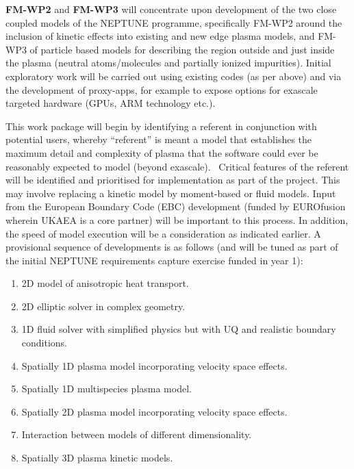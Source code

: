 \textbf{FM-WP2} and \textbf{FM-WP3} will concentrate upon development of the 
two close coupled models of the NEPTUNE
programme, specifically FM-WP2 around the inclusion of kinetic effects into 
existing and new edge plasma models, and
FM-WP3 of particle based models for describing the region outside and just 
inside the plasma (neutral atoms/molecules
and partially ionized impurities). Initial exploratory work will be carried out 
using existing codes (as per above) and
via the development of proxy-apps, for example to expose options for exascale 
targeted hardware (GPUs, ARM technology
etc.).

This work package will begin by identifying a referent in conjunction with 
potential users, whereby ``referent'' is
meant a model that establishes the maximum detail and complexity of plasma that 
the software could ever be reasonably
expected to model (beyond exascale). \ Critical features of the referent will 
be identified and prioritised for
implementation as part of the project. This may involve replacing a kinetic 
model by moment-based or fluid models.
Input from the European Boundary Code (EBC) development (funded by EUROfusion 
wherein UKAEA is a core partner) will be
important to this process. In addition, the speed of model execution will be a 
consideration as indicated earlier. A
provisional sequence of developments is as follows (and will be tuned as part 
of the initial NEPTUNE requirements
capture exercise funded in year 1):


\bigskip

\liststyleWWNumx
\begin{enumerate}
\item 2D model of anisotropic heat transport.
\item 2D elliptic solver in complex geometry.
\item 1D fluid solver with simplified physics but with UQ and realistic boundary conditions.
\item Spatially 1D plasma model incorporating velocity space effects.
\item Spatially 1D multispecies plasma model.
\item Spatially 2D plasma model incorporating velocity space effects.
\item Interaction between models of different dimensionality.
\item Spatially 3D plasma kinetic models.
\end{enumerate}

\bigskip

